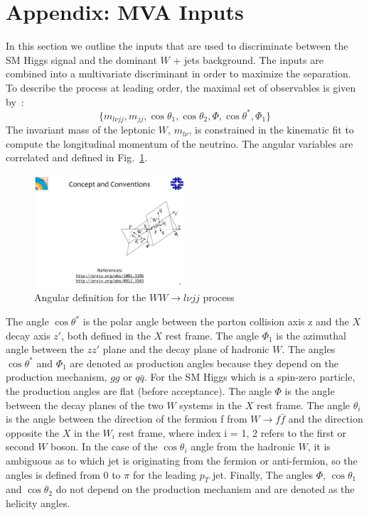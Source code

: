 \section{Appendix: MVA Inputs}
\label{app:mvainputs}

In this section we outline the inputs that are used to discriminate between the 
SM Higgs signal and the dominant $W$ + jets background.  
The inputs are combined into a multivariate discriminant in order to maximize the 
separation.  
To describe the process at leading order, the maximal set of observables is given by~\cite{Gao:2010qx,Dobrescu:2009zf}:
\begin{equation}
\{ m_{l\nu jj}, m_{jj}, \cos\theta_1, \cos\theta_2, \Phi, \cos\theta^{\ast}, \Phi_1 \}
\end{equation}
The invariant mass of the leptonic $W$, $m_{l\nu}$, is constrained in the kinematic fit to compute the longitudinal momentum 
of the neutrino.  The angular variables are correlated and defined in Fig.~\ref{fig:anglesWWlvjj}.
\begin{figure}[ht]
  \centering
  \includegraphics[width=0.5\textwidth]{plots/2012_MVAangles_wwlvjj.pdf}
  \caption{\label{fig:anglesWWlvjj}Angular definition for the $WW\to l\nu jj$ process}
\end{figure}
The angle $\cos\theta^{\ast}$ is the polar angle between the parton
collision axis z and the $X$ decay axis $z'$, both defined in the $X$
rest frame. The angle $\Phi_1$ is the azimuthal angle between the
$zz'$ plane and the decay plane of hadronic $W$. The angles
$\cos\theta^{\ast}$ and $\Phi_1$ are denoted as production angles
because they depend on the production mechanism, $gg$ or $q\bar{q}$.
For the SM Higgs which is a spin-zero particle, the production angles
are flat (before acceptance). The angle $\Phi$ is the angle between
the decay planes of the two $W$ systems in the $X$ rest frame. The
angle $\theta_i$ is the angle between the direction of the fermion f
from $W \to f\bar{f}$ and the direction opposite the $X$ in the $W_i$
rest frame, where index i = 1, 2 refers to the first or second $W$
boson.  In the case of the $\cos\theta_i$ angle from the hadronic $W$,
it is ambiguous as to which jet is originating from the fermion or
anti-fermion, so the angles is defined from $0$ to $\pi$ for the
leading $p_T$ jet.  Finally, The angles $\Phi$, $\cos\theta_1$ and
$\cos\theta_2$ do not depend on the production mechanism and are
denoted as the helicity angles.

